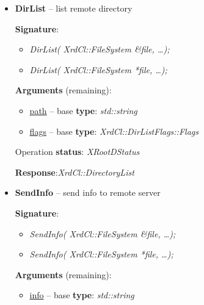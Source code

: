 \documentclass{article}
\begin{document}
\begin{itemize}
                \item \begin{samepage} \textbf{DirList} -- list remote directory

                    \textbf{Signature}:
                    \begin{itemize}
                        \item \textit{DirList( XrdCl::FileSystem \&file, \ldots);}
                        \item \textit{DirList( XrdCl::FileSystem *file, \ldots );}
                    \end{itemize}

                    \textbf{Arguments} (remaining):
                    \begin{itemize}
                        \item \underline{path} -- base \textbf{type}: \textit{std::string}
                        \item \underline{flags} -- base \textbf{type}: \textit{XrdCl::DirListFlags::Flags}
                    \end{itemize}

                    Operation \textbf{status}: \textit{XRootDStatus}

                    \textbf{Response}:\textit{XrdCl::DirectoryList}
                    
                \end{samepage}
                    
                \item \begin{samepage} \textbf{SendInfo} -- send info to remote server

                    \textbf{Signature}:
                    \begin{itemize}
                        \item \textit{SendInfo( XrdCl::FileSystem \&file, \ldots);}
                        \item \textit{SendInfo( XrdCl::FileSystem *file, \ldots );}
                    \end{itemize}

                    \textbf{Arguments} (remaining):
                    \begin{itemize}
                        \item \underline{info} -- base \textbf{type}: \textit{std::string}
                    \end{itemize}


\end{samepage}
\end{itemize}
\end{document}
